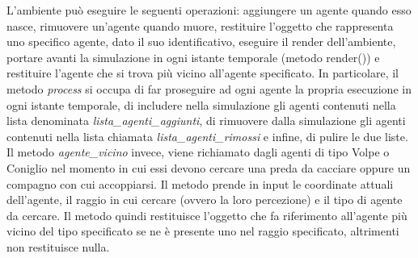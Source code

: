 \documentclass[11pt]{article}
\begin{document}
L'ambiente può eseguire le seguenti operazioni: aggiungere un agente quando esso nasce, rimuovere un'agente quando muore, restituire l'oggetto che rappresenta uno specifico agente, dato il suo identificativo, eseguire il render dell'ambiente, portare avanti la simulazione in ogni istante temporale (metodo render()) e restituire l'agente che si trova più vicino all'agente specificato. 
In particolare, il metodo \emph{process} si occupa di far proseguire ad ogni agente la propria esecuzione in ogni istante temporale, di includere nella simulazione gli agenti contenuti nella lista denominata \emph{lista\_agenti\_aggiunti}, di rimuovere dalla simulazione gli agenti contenuti nella lista chiamata \emph{lista\_agenti\_rimossi} e infine, di pulire le due liste. Il metodo \emph{agente\_vicino} invece, viene richiamato dagli agenti di tipo Volpe o Coniglio nel momento in cui essi devono cercare una preda da cacciare oppure un compagno con cui accoppiarsi. Il metodo prende in input le coordinate attuali dell'agente, il raggio in cui cercare (ovvero la loro percezione) e il tipo di agente da cercare. Il metodo quindi restituisce l'oggetto che fa riferimento all'agente più vicino del tipo specificato se ne è presente uno nel raggio specificato, altrimenti non restituisce nulla.    
\end{document}
